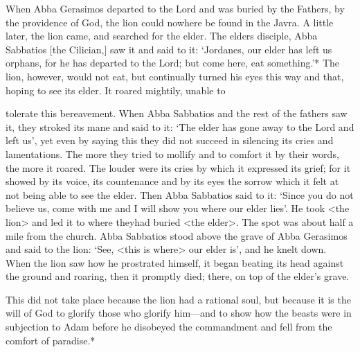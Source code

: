 When Abba Gerasimos departed to the Lord and was buried by
the Fathers, by the providence of God, the lion could nowhere be
found in the Javra.
A little later, the lion came, and searched for the
elder.
The elder\textquotesingle s disciple, Abba Sabbatios [the Cilician,] saw it and
said to it: `Jordanes, our elder has left us orphans, for he has
departed to the Lord; but come here, eat something.'* The lion,
however, would not eat, but continually turned his eyes this way
and that, hoping to see its elder.
It roared mightily, unable to

tolerate this bereavement.
When Abba Sabbatios and the rest of the
fathers saw it, they stroked its mane and said to it: `The elder has
gone away to the Lord and left us', yet even by saying this they did
not succeed in silencing its cries and lamentations.
The more they
tried to mollify and to comfort it by their words, the more it roared.
The louder were its cries by which it expressed its grief; for it
showed by its voice, its countenance and by its eyes the sorrow
which it felt at not being able to see the elder.
Then Abba Sabbatios
said to it: `Since you do not believe us, come with me and I will
show you where our elder lies'.
He took <the lion> and led it to
where theyhad buried <the elder>.
The spot was about half a mile
from the church.
Abba Sabbatios stood above the grave of Abba
Gerasimos and said to the lion: `See, <this is where> our elder is',
and he knelt down.
When the lion saw how he prostrated himself,
it began beating its head against the ground and roaring, then it
promptly died; there, on top of the elder's grave.

This did not take place because the lion had a rational soul, but
because it is the will of God to glorify those who glorify him—and
to show how the beasts were in subjection to Adam before he
disobeyed the commandment and fell from the comfort of paradise.*

